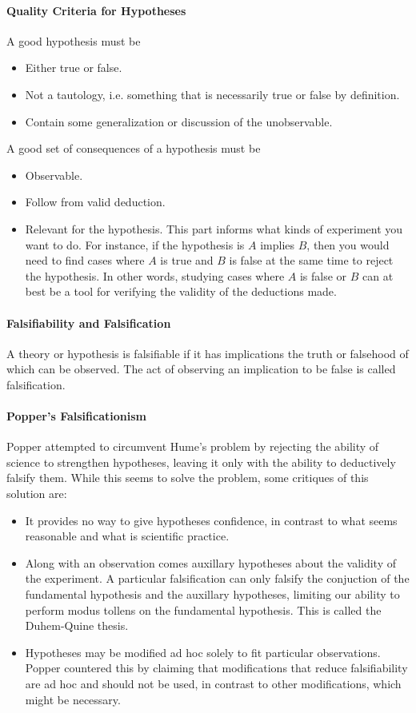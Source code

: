 \paragraph{Quality Criteria for Hypotheses}
A good hypothesis must be
\begin{itemize}
	\item Either true or false.
	\item Not a tautology, i.e. something that is necessarily true or false by definition.
	\item Contain some generalization or discussion of the unobservable.
\end{itemize}

A good set of consequences of a hypothesis must be
\begin{itemize}
	\item Observable.
	\item Follow from valid deduction.
	\item Relevant for the hypothesis. This part informs what kinds of experiment you want to do. For instance, if the hypothesis is $A$ implies $B$, then you would need to find cases where $A$ is true and $B$ is false at the same time to reject the hypothesis. In other words, studying cases where $A$ is false or $B$ can at best be a tool for verifying the validity of the deductions made.
\end{itemize}

\paragraph{Falsifiability and Falsification}
A theory or hypothesis is falsifiable if it has implications the truth or falsehood of which can be observed. The act of observing an implication to be false is called falsification.

\paragraph{Popper's Falsificationism}
Popper attempted to circumvent Hume's problem by rejecting the ability of science to strengthen hypotheses, leaving it only with the ability to deductively falsify them. While this seems to solve the problem, some critiques of this solution are:
\begin{itemize}
	\item It provides no way to give hypotheses confidence, in contrast to what seems reasonable and what is scientific practice.
	\item Along with an observation comes auxillary hypotheses about the validity of the experiment. A particular falsification can only falsify the conjuction of the fundamental hypothesis and the auxillary hypotheses, limiting our ability to perform modus tollens on the fundamental hypothesis. This is called the Duhem-Quine thesis.
	\item Hypotheses may be modified ad hoc solely to fit particular observations. Popper countered this by claiming that modifications that reduce falsifiability are ad hoc and should not be used, in contrast to other modifications, which might be necessary.
\end{itemize}


